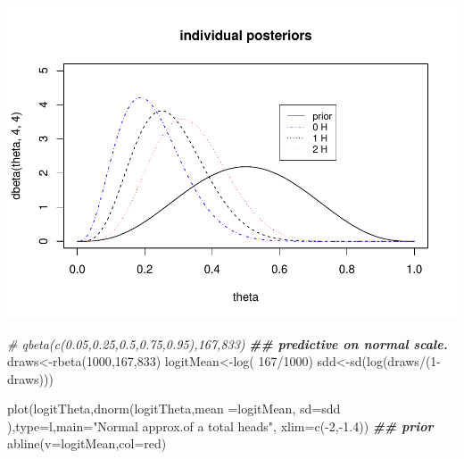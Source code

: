 \documentclass[
]{book}
\newenvironment{Shaded}{\begin{snugshade}}{\end{snugshade}}
\newcommand{\AttributeTok}[1]{\textcolor[rgb]{0.77,0.63,0.00}{#1}}
\newcommand{\CommentTok}[1]{\textcolor[rgb]{0.56,0.35,0.01}{\textit{#1}}}
\newcommand{\DecValTok}[1]{\textcolor[rgb]{0.00,0.00,0.81}{#1}}
\newcommand{\DocumentationTok}[1]{\textcolor[rgb]{0.56,0.35,0.01}{\textbf{\textit{#1}}}}
\newcommand{\FloatTok}[1]{\textcolor[rgb]{0.00,0.00,0.81}{#1}}
\newcommand{\FunctionTok}[1]{\textcolor[rgb]{0.00,0.00,0.00}{#1}}
\newcommand{\NormalTok}[1]{#1}
\newcommand{\OtherTok}[1]{\textcolor[rgb]{0.56,0.35,0.01}{#1}}
\newcommand{\SpecialCharTok}[1]{\textcolor[rgb]{0.00,0.00,0.00}{#1}}
\newcommand{\StringTok}[1]{\textcolor[rgb]{0.31,0.60,0.02}{#1}}
\theoremstyle{definition}
\theoremstyle{definition}
\theoremstyle{definition}
\theoremstyle{definition}
\theoremstyle{remark}
\begin{document}
\includegraphics{_main_files/figure-latex/unnamed-chunk-11-1.pdf}

\begin{Shaded}
\begin{Highlighting}[]
   \CommentTok{\#  qbeta(c(0.05,0.25,0.5,0.75,0.95),167,833)}
    \DocumentationTok{\#\# predictive on normal scale.}
\NormalTok{     draws}\OtherTok{\textless{}{-}}\FunctionTok{rbeta}\NormalTok{(}\DecValTok{1000}\NormalTok{,}\DecValTok{167}\NormalTok{,}\DecValTok{833}\NormalTok{)}
\NormalTok{     logitMean}\OtherTok{\textless{}{-}}\FunctionTok{log}\NormalTok{( }\DecValTok{167}\SpecialCharTok{/}\DecValTok{1000}\NormalTok{)}
\NormalTok{  sdd}\OtherTok{\textless{}{-}}\FunctionTok{sd}\NormalTok{(}\FunctionTok{log}\NormalTok{(draws}\SpecialCharTok{/}\NormalTok{(}\DecValTok{1}\SpecialCharTok{{-}}\NormalTok{draws)))}

  \FunctionTok{plot}\NormalTok{(logitTheta,}\FunctionTok{dnorm}\NormalTok{(logitTheta,}\AttributeTok{mean =}\NormalTok{logitMean, }\AttributeTok{sd=}\NormalTok{sdd ),}\AttributeTok{type=}\StringTok{\textquotesingle{}l\textquotesingle{}}\NormalTok{,}\AttributeTok{main=}\StringTok{"Normal approx.of a total heads"}\NormalTok{, }\AttributeTok{xlim=}\FunctionTok{c}\NormalTok{(}\SpecialCharTok{{-}}\DecValTok{2}\NormalTok{,}\SpecialCharTok{{-}}\FloatTok{1.4}\NormalTok{)) }\DocumentationTok{\#\# prior}
    \FunctionTok{abline}\NormalTok{(}\AttributeTok{v=}\NormalTok{logitMean,}\AttributeTok{col=}\StringTok{\textquotesingle{}red\textquotesingle{}}\NormalTok{)}
\end{Highlighting}
\end{Shaded}
\end{document}
